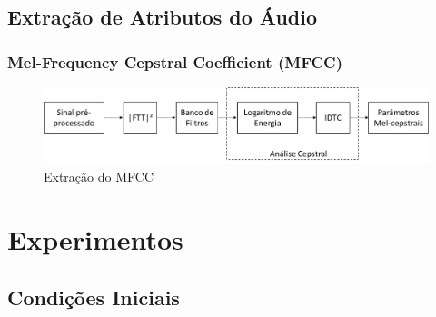 \documentclass{beamer}
\begin{document}
\subsection{Extração de Atributos do Áudio}
  		


\begin{frame}
  	\frametitle{Mel-Frequency Cepstral Coefficient (MFCC)}
    
    \begin{figure}[ht]
    \centering
	\includegraphics[width=\textwidth]{mfcc.jpg}
	\caption{Extração do MFCC}
	\label{fig:exampleFig1}
	\end{figure}
\end{frame}

\section{Experimentos}



\subsection{Condições Iniciais}
\end{document}
